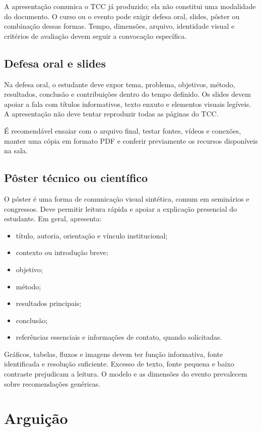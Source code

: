A apresentação comunica o TCC já produzido; ela não constitui uma modalidade do documento. O curso ou o evento pode exigir defesa oral, slides, pôster ou combinação dessas formas. Tempo, dimensões, arquivo, identidade visual e critérios de avaliação devem seguir a convocação específica.

\subsection{Defesa oral e slides}

Na defesa oral, o estudante deve expor tema, problema, objetivos, método, resultados, conclusão e contribuições dentro do tempo definido. Os slides devem apoiar a fala com títulos informativos, texto enxuto e elementos visuais legíveis. A apresentação não deve tentar reproduzir todas as páginas do TCC.

É recomendável ensaiar com o arquivo final, testar fontes, vídeos e conexões, manter uma cópia em formato PDF e conferir previamente os recursos disponíveis na sala.

\subsection{Pôster técnico ou científico}

O pôster é uma forma de comunicação visual sintética, comum em seminários e congressos. Deve permitir leitura rápida e apoiar a explicação presencial do estudante. Em geral, apresenta:

\begin{itemize}
  \item título, autoria, orientação e vínculo institucional;
  \item contexto ou introdução breve;
  \item objetivo;
  \item método;
  \item resultados principais;
  \item conclusão;
  \item referências essenciais e informações de contato, quando solicitadas.
\end{itemize}

Gráficos, tabelas, fluxos e imagens devem ter função informativa, fonte identificada e resolução suficiente. Excesso de texto, fonte pequena e baixo contraste prejudicam a leitura. O modelo e as dimensões do evento prevalecem sobre recomendações genéricas.

\section{Arguição}

